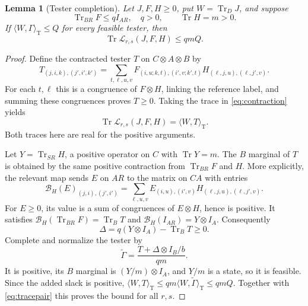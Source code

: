 \documentclass[11pt]{article}
\newcommand{\Tr}{\operatorname{Tr}}
\newcommand{\pair}[2]{\langle #1,#2\rangle_{\mathrm T}}
\newtheorem{lemma}[theorem]{Lemma}
\theoremstyle{remark}
\begin{document}
\begin{lemma}[Tester completion]\label{lem:tester}
Let $J,F,H\geq0$, put $W=\Tr_DJ$, and suppose
\[
 \Tr_{BR}F\leq qI_{AR},\quad q>0,\qquad\Tr H=m>0.
\]
If $\pair{W}{\Gamma}\leq Q$ for every feasible tester, then
\begin{equation}\label{eq:tracebound}
 \Tr\mathcal L_{r,s}(J,F,H)\leq qmQ.
\end{equation}
\end{lemma}
\begin{proof}
Define the contracted tester $T$ on $C\otimes A\otimes B$ by
\begin{equation}\label{eq:tester}
 T_{(j,i,k),(j',i',k')}=
 \sum_{t,\ell,u,v}F_{(i,u;k,t),(i',v;k',t)}
                       H_{(\ell,j,u),(\ell,j',v)}.
\end{equation}
For each $t,\ell$ this is a congruence of $F\otimes H$, linking the
reference label, and summing these congruences proves $T\geq0$.
Taking the trace in \eqref{eq:contraction} yields
\begin{equation}\label{eq:tracepair}
 \Tr\mathcal L_{r,s}(J,F,H)=\pair{W}{T}.
\end{equation}
Both traces here are real for the positive arguments.

Let $Y=\Tr_{SR}H$, a positive operator on $C$ with $\Tr Y=m$.
The $B$ marginal of $T$ is obtained by the same positive contraction from
$\Tr_{BR}F$ and $H$. More explicitly, the relevant map sends $E$ on $AR$ to
the matrix on $CA$ with entries
\[
 \mathcal B_H(E)_{(j,i),(j',i')}=
 \sum_{\ell,u,v}E_{(i,u),(i',v)}H_{(\ell,j,u),(\ell,j',v)}.
\]
For $E\geq0$, its value is a sum of congruences of $E\otimes H$, hence is
positive. It satisfies
$\mathcal B_H(\Tr_{BR}F)=\Tr_BT$ and
$\mathcal B_H(I_{AR})=Y\otimes I_A$. Consequently
\[
 \Delta=q(Y\otimes I_A)-\Tr_BT\geq0.
\]
Complete and normalize the tester by
\begin{equation}\label{eq:completion}
 \widetilde\Gamma=\frac{T+\Delta\otimes I_B/b}{qm}.
\end{equation}
It is positive, its $B$ marginal is $(Y/m)\otimes I_A$, and $Y/m$ is a
state, so it is feasible. Since the added slack is positive,
$\pair{W}{T}\leq qm\pair{W}{\widetilde\Gamma}\leq qmQ$.
Together with \eqref{eq:tracepair} this proves the bound for all $r,s$.
\end{proof}
\end{document}
